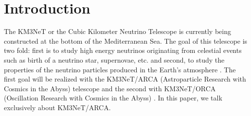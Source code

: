 

\chapter{Introduction}

\graphicspath{{1-introduction/figures/}}





The KM3NeT or the Cubic Kilometer Neutrino Telescope is currently being
constructed at the bottom of the Mediterranean Sea. The goal of this telescope
is two fold: first is to study high energy neutrinos originating from celestial
events such as birth of a neutrino star, supernovae, etc. and second, to study
the properties of the neutrino particles produced in the Earth's atmosphere
\cite{adrian2016letter}. The first goal will be realized with the KM3NeT/ARCA
(Astroparticle Research with Cosmics in the Abyss) telescope and the second
with KM3NeT/ORCA (Oscillation Research with Cosmics in the Abyss)
\cite{adrian2016letter}. In this paper, we talk exclusively about KM3NeT/ARCA.

